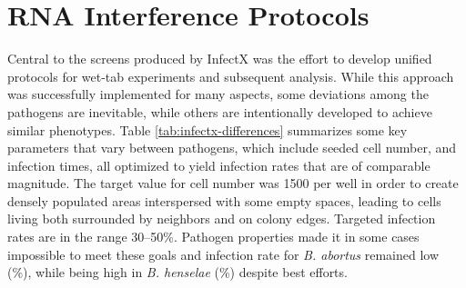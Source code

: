 \section{RNA Interference Protocols}
Central to the  screens produced by InfectX was the effort to develop unified protocols for wet-tab experiments and subsequent analysis. While this approach was successfully implemented for many aspects, some deviations among the pathogens are inevitable, while others are intentionally developed to achieve similar phenotypes. Table \ref{tab:infectx-differences} summarizes some key parameters that vary between pathogens, which include seeded cell number,  and infection times, all optimized to yield infection rates that are of comparable magnitude. The target value for cell number was 1500 per well in order to create densely populated areas interspersed with some empty spaces, leading to cells living both surrounded by neighbors and on colony edges. Targeted infection rates are in the range 30--50\%. Pathogen properties made it in some cases impossible to meet these goals and infection rate for \textit{B. abortus} remained low (\%), while being high in \textit{B. henselae} (\%) despite best efforts.


